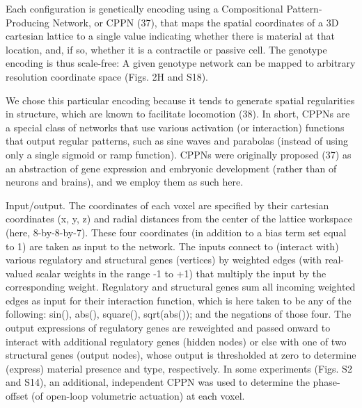 Each configuration is genetically encoding using a Compositional Pattern-Producing Network, or CPPN (37), that maps the spatial coordinates of a 3D cartesian lattice to a single value indicating whether there is material at that location, and, if so, whether it is a contractile or passive cell. The genotype encoding is thus scale-free: A given genotype network can be mapped to arbitrary resolution coordinate space (Figs. 2H and S18). 

We chose this particular encoding because it tends to generate spatial regularities in structure, which are known to facilitate locomotion (38). In short, CPPNs are a special class of networks that use various activation (or interaction) functions that output regular patterns, such as sine waves and parabolas (instead of using only a single sigmoid or ramp function). CPPNs were originally proposed (37) as an abstraction of gene expression and embryonic development (rather than of neurons and brains), and we employ them as such here.

Input/output.  The coordinates of each voxel are specified by their cartesian coordinates (x, y, z) and radial distances from the center of the lattice workspace (here, 8-by-8-by-7). These four coordinates (in addition to a bias term set equal to 1) are taken as input to the network. The inputs connect to (interact with) various regulatory and structural genes (vertices) by weighted edges (with real-valued scalar weights in the range -1 to +1) that multiply the input by the corresponding weight. Regulatory and structural genes sum all incoming weighted edges as input for their interaction function, which is here taken to be any of the following: sin(), abs(), square(), sqrt(abs()); and the negations of those four. The output expressions of regulatory genes are reweighted and passed onward to interact with additional regulatory genes (hidden nodes) or else with one of two structural genes (output nodes), whose output is thresholded at zero to determine (express) material presence and type, respectively. In some experiments (Figs. S2 and S14), an additional, independent CPPN was used to determine the phase-offset (of open-loop volumetric actuation) at each voxel.

